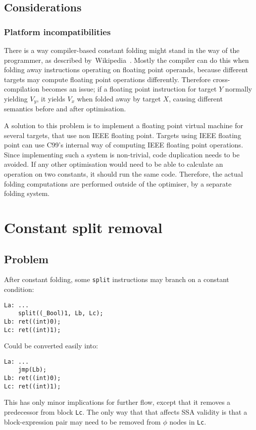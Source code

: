 \documentclass[12pt, a4paper]{article}
\begin{document}
\subsection{Considerations}
\subsubsection{Platform incompatibilities}
There is a way compiler-based constant folding might stand in the way of the 
programmer, as described by~Wikipedia~\cite{cfld_cross}. Mostly the compiler can do this when folding
away instructions  operating on floating point operands, because different targets may compute 
floating point operations differently. Therefore cross-compilation becomes an 
issue; if a floating point instruction for target $Y$ normally yielding $V_y$, it 
yields $V_x$ when folded away by target $X$, causing different semantics before and 
after optimisation.

A solution to this problem is to implement a floating point virtual machine for 
several targets, that use non IEEE floating point. Targets using IEEE floating 
point can use C99's internal way of computing IEEE floating point operations.
Since implementing such a system is non-trivial, code duplication needs to be 
avoided. If any other optimisation would need to be able to calculate an 
operation on two constants, it should run the same code. Therefore, the actual 
folding computations are performed outside of the optimiser, by a separate 
folding system.


\section{Constant split removal}
\subsection{Problem}
After constant folding, some \verb+split+ instructions may branch on a constant
condition:

\begin{lstlisting}
La:	...
	split((_Bool)1, Lb, Lc);
Lb:	ret((int)0);
Lc:	ret((int)1);
\end{lstlisting}

Could be converted easily into:

\begin{lstlisting}
La:	...
	jmp(Lb);
Lb:	ret((int)0);
Lc:	ret((int)1);
\end{lstlisting}

This has only minor implications for further flow, except that it removes a
predecessor from block \verb+Lc+. The only way that that affects SSA validity is
that a block-expression pair may need to be removed from $\phi$ nodes in
\verb+Lc+.
\end{document}

